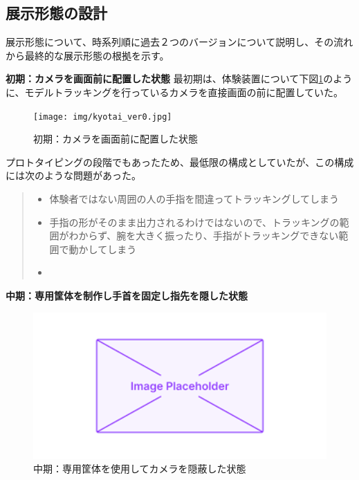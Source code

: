 \subsection{展示形態の設計}
展示形態について、時系列順に過去２つのバージョンについて説明し、その流れから最終的な展示形態の根拠を示す。

\textbf{初期：カメラを画面前に配置した状態}
最初期は、体験装置について下図\ref{fig:kyotai_ver0}のように、モデルトラッキングを行っているカメラを直接画面の前に配置していた。
\begin{figure}[H]
  \centering
  \texttt{[image: img/kyotai\_ver0.jpg]}
  \caption{初期：カメラを画面前に配置した状態}
  \label{fig:kyotai_ver0}
\end{figure}

プロトタイピングの段階でもあったため、最低限の構成としていたが、この構成には次のような問題があった。
\begin{quote}
  \begin{itemize}
    \item 体験者ではない周囲の人の手指を間違ってトラッキングしてしまう
    \item 手指の形がそのまま出力されるわけではないので、トラッキングの範囲がわからず、腕を大きく振ったり、手指がトラッキングできない範囲で動かしてしまう
    \item 
  \end{itemize}
\end{quote}



\textbf{中期：専用筐体を制作し手首を固定し指先を隠した状態}
\begin{figure}[H]
  \centering
  \includegraphics[width=15cm]{img/placeholder.png}
  \caption{中期：専用筐体を使用してカメラを隠蔽した状態}
  \label{fig:kyotai_ver1}
\end{figure}

